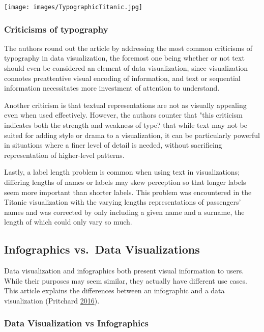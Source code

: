 \documentclass[]{book}
\begin{document}
\texttt{[image: images/TypographicTitanic.jpg]}

\hypertarget{criticisms-of-typography}{%
\subsubsection{Criticisms of typography}\label{criticisms-of-typography}}

The authors round out the article by addressing the most common criticisms of typography in data visualization, the foremost one being whether or not text should even be considered an element of data visualization, since visualization connotes preattentive visual encoding of information, and text or sequential information necessitates more investment of attention to understand.

Another criticism is that textual representations are not as visually appealing even when used effectively. However, the authors counter that "this criticism indicates both the strength and weakness of type? that while text may not be suited for adding style or drama to a visualization, it can be particularly powerful in situations where a finer level of detail is needed, without sacrificing representation of higher-level patterns.

Lastly, a label length problem is common when using text in visualizations; differing lengths of names or labels may skew perception so that longer labels seem more important than shorter labels. This problem was encountered in the Titanic visualization with the varying lengths representations of passengers' names and was corrected by only including a given name and a surname, the length of which could only vary so much.

\hypertarget{infographics-vs.data-visualizations-1}{%
\subsection{Infographics vs.~Data Visualizations}\label{infographics-vs.data-visualizations-1}}

Data visualization and infographics both present visual information to users. While their purposes may seem similar, they actually have different use cases. This article explains the differences between an infographic and a data visualization (Pritchard \protect\hyperlink{ref-VIZVSINFO}{2016}).

\hypertarget{data-visualization-vs-infographics}{%
\subsubsection{Data Visualization vs Infographics}\label{data-visualization-vs-infographics}}
\end{document}
